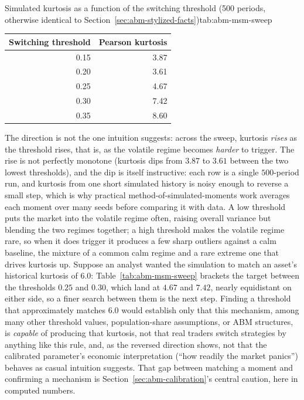 \documentclass[../ai_in_finance]{subfiles}
\begin{document}
\begin{booktable}[htbp]{Simulated kurtosis as a function of the switching threshold (500 periods, otherwise identical to Section~\ref{sec:abm-stylized-facts})}{tab:abm-msm-sweep}
\begin{tabular}{rr}
\toprule
Switching threshold & Pearson kurtosis \\
\midrule
0.15 & 3.87 \\
0.20 & 3.61 \\
0.25 & 4.67 \\
0.30 & 7.42 \\
0.35 & 8.60 \\
\bottomrule
\end{tabular}
\end{booktable}

The direction is not the one intuition suggests: across the sweep, kurtosis \emph{rises} as the threshold rises, that is, as the volatile regime becomes \emph{harder} to trigger. The rise is not perfectly monotone (kurtosis dips from $3.87$ to $3.61$ between the two lowest thresholds), and the dip is itself instructive: each row is a single $500$-period run, and kurtosis from one short simulated history is noisy enough to reverse a small step, which is why practical method-of-simulated-moments work averages each moment over many seeds before comparing it with data. A low threshold puts the market into the volatile regime often, raising overall variance but blending the two regimes together; a high threshold makes the volatile regime rare, so when it does trigger it produces a few sharp outliers against a calm baseline, the mixture of a common calm regime and a rare extreme one that drives kurtosis up. Suppose an analyst wanted the simulation to match an asset's historical kurtosis of $6.0$: Table~\ref{tab:abm-msm-sweep} brackets the target between the thresholds $0.25$ and $0.30$, which land at $4.67$ and $7.42$, nearly equidistant on either side, so a finer search between them is the next step. Finding a threshold that approximately matches $6.0$ would establish only that this mechanism, among many other threshold values, population-share assumptions, or ABM structures, is \emph{capable} of producing that kurtosis, not that real traders switch strategies by anything like this rule, and, as the reversed direction shows, not that the calibrated parameter's economic interpretation (``how readily the market panics'') behaves as casual intuition suggests. That gap between matching a moment and confirming a mechanism is Section~\ref{sec:abm-calibration}'s central caution, here in computed numbers.
\end{document}
